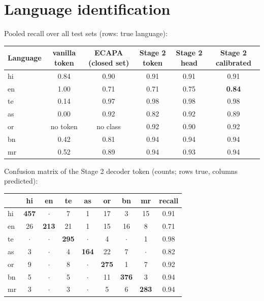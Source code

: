 \section{Language identification}

Pooled recall over all test sets (rows: true language):

\begin{center}
\small
\begin{tabular}{lccccc}
\toprule
Language & vanilla token & ECAPA (closed set) & Stage 2 token & Stage 2 head & Stage 2 calibrated\\
\midrule
hi & 0.84 & 0.90 & 0.91 & 0.91 & 0.91\\
en & 1.00 & 0.71 & 0.71 & 0.75 & \textbf{0.84}\\
te & 0.14 & 0.97 & 0.98 & 0.98 & 0.98\\
as & 0.00 & 0.92 & 0.82 & 0.92 & 0.89\\
or & no token & no class & 0.92 & 0.90 & 0.92\\
bn & 0.42 & 0.81 & 0.94 & 0.94 & 0.94\\
mr & 0.52 & 0.89 & 0.94 & 0.93 & 0.94\\
\bottomrule
\end{tabular}
\end{center}

Confusion matrix of the Stage 2 decoder token (counts; rows true, columns predicted):

\begin{center}
\begin{tabular}{l|ccccccc|c}
 & hi & en & te & as & or & bn & mr & recall\\\hline
hi & \textbf{457} & $\cdot$ & 7 & 1 & 17 & 3 & 15 & 0.91\\
en & 26 & \textbf{213} & 21 & 1 & 15 & 16 & 8 & 0.71\\
te & $\cdot$ & $\cdot$ & \textbf{295} & $\cdot$ & 4 & $\cdot$ & 1 & 0.98\\
as & 3 & $\cdot$ & 4 & \textbf{164} & 22 & 7 & $\cdot$ & 0.82\\
or & 9 & $\cdot$ & 8 & $\cdot$ & \textbf{275} & 1 & 7 & 0.92\\
bn & 5 & $\cdot$ & 5 & $\cdot$ & 11 & \textbf{376} & 3 & 0.94\\
mr & 3 & $\cdot$ & 3 & $\cdot$ & 5 & 6 & \textbf{283} & 0.94\\
\end{tabular}
\end{center}


